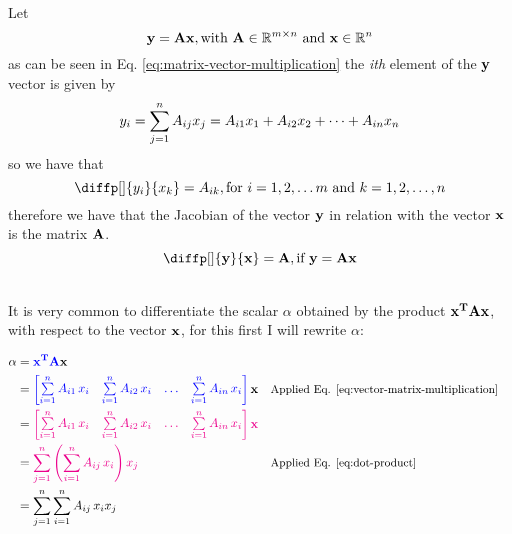 \documentclass[12pt]{article}
\begin{document}
\\
Let
\begin{equation*}
   \bvec{y} = \mat{A} \bvec{x}, \text{with $\mat{A} \in \R^{m\times n}$ and $\bvec{x} \in \R^n $}
\end{equation*}
as can be seen in Eq. \ref{eq:matrix-vector-multiplication} the \textit{ith} element of the $\bvec{y}$ vector is given by
\begin{equation*}
    y_i = \Sum[j]{1}{n} A_{ij}x_j = A_{i1}x_1 + A_{i2}x_2 + \dots + A_{in}x_n
\end{equation*}
so we have that
\begin{equation*}
    \diffp[]{y_i}{x_k} = A_{ik}, \text{for $i = 1, 2, \dots m$  and $k = 1, 2, \dots, n$}
\end{equation*}
therefore we have that the Jacobian of the vector $\bvec{y}$ in relation with the vector $\bvec{x}$ is the matrix $\mat{A}$.
\begin{equation}
    \diffp[]{\bvec{y}}{\bvec{x}} = \mat{A}, \text{if $\bvec{y} = \mat{A}\bvec{x}$}
    \label{eq:dydy_in_matrix_form}
\end{equation}

\\
It is very common to differentiate the scalar $\alpha$ obtained by the product $\bvecT{x}\mat{A}\bvec{x}$, with respect to the vector $\bvec{x}$, for this first I will rewrite $\alpha$:

\begin{equation}
    \begin{aligned}
        \alpha &= \blue{\bvecT{x}\mat{A}}\bvec{x}\\
        &= \blue{\begin{bmatrix}
        \sum\limits_{i = 1}^{n} A_{i1} \, x_i &
        \sum\limits_{i = 1}^{n} A_{i2} \, x_i & \dots &
        \sum\limits_{i = 1}^{n} A_{in} \, x_i
    \end{bmatrix}} \bvec{x} && \text{\small Applied Eq. \ref{eq:vector-matrix-multiplication}} \\
    &= \magenta{\begin{bmatrix}
        \sum\limits_{i = 1}^{n} A_{i1} \, x_i &
        \sum\limits_{i = 1}^{n} A_{i2} \, x_i & \dots &
        \sum\limits_{i = 1}^{n} A_{in} \, x_i
    \end{bmatrix}\bvec{x}} \\
    &= \magenta{\Sum[j]{1}{n} 
        \parentheses{\sum\limits_{i = 1}^{n} A_{ij} \, x_i}
    x_j} && \text{\small Applied Eq. \ref{eq:dot-product}} \\
    &= \Sum[j]{1}{n} 
        \sum\limits_{i = 1}^{n} A_{ij} \, x_i x_j
    \end{aligned}
\end{equation}
\end{document}
